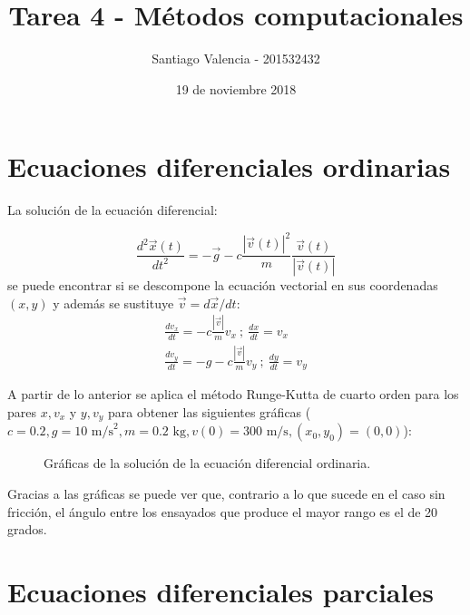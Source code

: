 \documentclass{article}
\title{Tarea 4 - Métodos computacionales}
\author{Santiago Valencia - 201532432}
\date{19 de noviembre 2018}
\begin{document}
\maketitle

\section*{Ecuaciones diferenciales ordinarias}

La solución de la ecuación diferencial:

\begin{equation*}
    \frac{d^2\vec{x}(t)}{dt^2} = -\vec{g} - c\frac{|\vec{v}(t)|^2}{m}\frac{\vec{v}(t)}{|\vec{v}(t)|}
\end{equation*}
se puede encontrar si se descompone la ecuación vectorial en sus coordenadas $(x, y)$ y además se sustituye $\vec{v} = d\vec{x}/dt$:
\begin{gather*}
    \frac{dv_x}{dt} = -c\frac{|\vec{v}|}{m}v_x \ ; \ \frac{dx}{dt} = v_x \\
    \frac{dv_y}{dt} = -g - c\frac{|\vec{v}|}{m}v_y \ ; \ \frac{dy}{dt} = v_y
\end{gather*}

A partir de lo anterior se aplica el método Runge-Kutta de cuarto orden para los pares $x, v_x$ y $y, v_y$ para obtener las siguientes gráficas ($c = 0.2, g = 10 \text{ m/s}^2, m = 0.2 \text{ kg}, v(0) = 300 \text{ m/s}, (x_0, y_0) = (0, 0)$):

\begin{figure}[h]
\centering
    \label{fig:aux}
    \caption{Gráficas de la solución de la ecuación diferencial ordinaria.}
\end{figure}

Gracias a las gráficas se puede ver que, contrario a lo que sucede en el caso sin fricción, el ángulo entre los ensayados que produce el mayor rango es el de 20 grados.




\section*{Ecuaciones diferenciales parciales}
\end{document}
